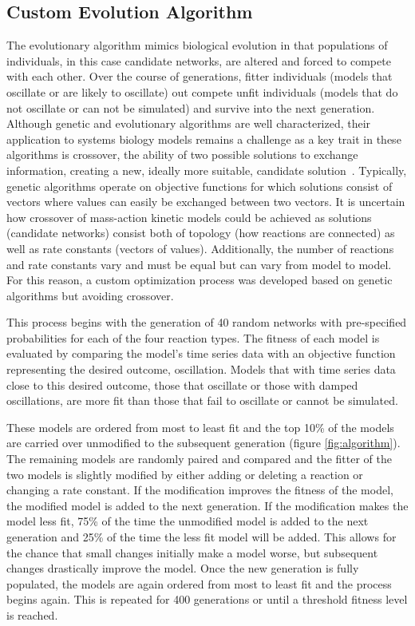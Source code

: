 \documentclass[12pt]{report}
\begin{document}
\subsection{Custom Evolution Algorithm}

The evolutionary algorithm mimics biological evolution in that populations of individuals, in this case candidate networks, are altered and forced to compete with each other. Over the course of generations, fitter individuals (models that oscillate or are likely to oscillate) out compete unfit individuals (models that do not oscillate or can not be simulated) and survive into the next generation. Although genetic and evolutionary algorithms are well characterized, their application to systems biology models remains a challenge as a key trait in these algorithms is crossover, the ability of two possible solutions to exchange information, creating a new, ideally more suitable, candidate solution~\cite{Katoch2020}. Typically, genetic algorithms operate on objective functions for which solutions consist of vectors where values can easily be exchanged between two vectors. It is uncertain how crossover of mass-action kinetic models could be achieved as solutions (candidate networks) consist both of topology (how reactions are connected) as well as rate constants (vectors of values). Additionally, the number of reactions and rate constants vary and must be equal but can vary from model to model. For this reason, a custom optimization process was developed based on genetic algorithms but avoiding crossover. 

This process begins with the generation of 40 random networks with pre-specified probabilities for each of the four reaction types.  The fitness of each model is evaluated by comparing the model's time series data with an objective function representing the desired outcome, oscillation. Models that with time series data close to this desired outcome, those that oscillate or those with damped oscillations, are more fit than those that fail to oscillate or cannot be simulated. 

These models are ordered from most to least fit and the top 10\% of the models are carried over unmodified to the subsequent generation (figure \ref{fig:algorithm}). The remaining models are randomly paired and compared and the fitter of the two models is slightly modified by either adding or deleting a reaction or changing a rate constant. If the modification improves the fitness of the model, the modified model is added to the next generation. If the modification makes the model less fit, 75\% of the time the unmodified model is added to the next generation and 25\% of the time the less fit model will be added. This allows for the chance that small changes initially make a model worse, but subsequent changes drastically improve the model. Once the new generation is fully populated, the models are again ordered from most to least fit and the process begins again. This is repeated for 400 generations or until a threshold fitness level is reached.
\end{document}
